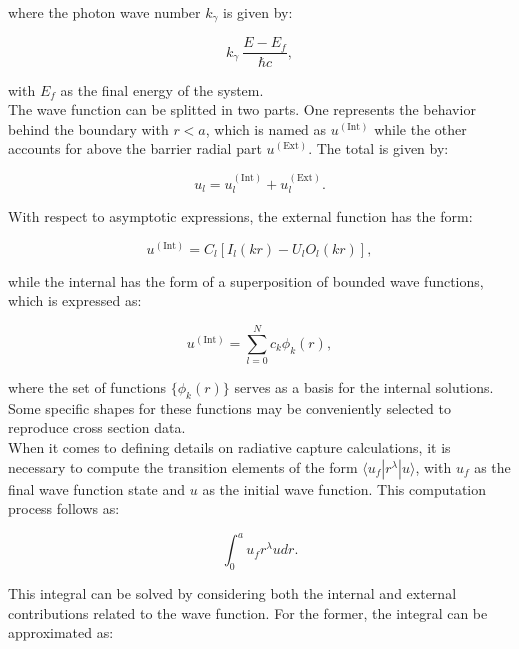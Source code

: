 \documentclass[openany]{book}
\begin{document}
where the photon wave number $k_\gamma$ is given by:

\begin{equation}\label{rmatrix_radiativeCapture_waveNumberPhoton}
	k_\gamma \ \frac{E- E_f}{\hbar c},
\end{equation}

with $E_f$ as the final energy of the system. \\


The wave function can be splitted in two parts. One represents the behavior behind the boundary with $r < a$, which is named as $u^{(\mathrm{Int})}$ while the other accounts for above the barrier radial part $u^{(\mathrm{Ext})}$. The total is given by: 

\begin{equation}\label{rmatrix_internal_external}
	u_l = u^{(\mathrm{Int})}_l +  u^{(\mathrm{Ext})}_l.
\end{equation} 

With respect to asymptotic expressions, the external function has the form: 

\begin{equation}\label{rmatrix_external_asymptotic}
	u^{(\mathrm{Int})} = C_l [I_l(kr) - U_l O_l(kr)],
\end{equation} 

while the internal has the form of a superposition of bounded wave functions, which is expressed as: 

\begin{equation}\label{rmatrix_internal_asymptotic}
	u^{(\mathrm{Int})} = \sum_{l=0}^{N} c_k \phi_k(r),
\end{equation} 

where the set of functions $\{\phi_k(r)\}$ serves as a basis for the internal solutions. Some specific shapes for these functions may be conveniently selected to reproduce cross section data. \\

When it comes to defining details on radiative capture calculations, it is necessary to compute the transition elements of the form $\langle u_f | r^\lambda| u \rangle $, with $u_f$ as the final wave function state and $u$ as the initial wave function. This computation process follows as:
 
\begin{equation}\label{rmatrix_radiativeCapture_integral}
	\int_0^{a} u_f r^\lambda u  dr.
\end{equation}

This integral can be solved by considering both the internal and external contributions related to the wave function. For the former, the integral can be approximated as: 
\end{document}
